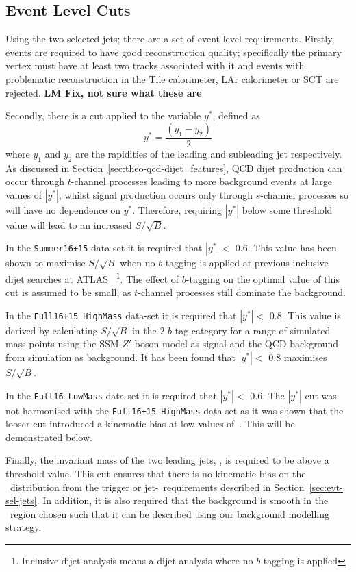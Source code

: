 \subsection{Event Level Cuts}
\label{sec:evt-sel-event}

Using the two selected jets; there are a set of event-level requirements.
Firstly, events are required to have good reconstruction quality;
specifically the primary vertex
must have at least two tracks associated with it
and events with problematic reconstruction in the Tile calorimeter, LAr calorimeter or SCT are rejected.
\textbf{LM Fix, not sure what these are}

\noindent
Secondly, there is a cut applied to the variable $y^*$, defined as
\begin{equation}
  y^* = \frac{(y_1-y_2)}{2}
\end{equation}
where $y_1$ and $y_2$ are the rapidities of the leading and subleading jet respectively.
As discussed in Section~\ref{sec:theo-qcd-dijet_features}, QCD dijet production can occur through $t$-channel processes leading to more background events at large values of $|y^*|$,
whilst signal production occurs only through $s$-channel processes so will have no dependence on $y^*$.
Therefore, requiring $|y^*|$ below some threshold value will lead to an increased $S/\sqrt{B}$.

In the \verb|Summer16+15| data-set it is required that $|y^*| <$ 0.6.
This value has been shown to maximise $S/\sqrt{B}$ when no $b$-tagging is applied
at previous inclusive dijet searches at ATLAS~\cite{dijet-mori16_paper}
\footnote{Inclusive dijet analysis means a dijet analysis where no $b$-tagging is applied}.
The effect of $b$-tagging on the optimal value of this cut is assumed to be small,
as $t$-channel processes still dominate the background.

In the \verb|Full16+15_HighMass| data-set it is required that $|y^*| <$ 0.8.
This value is derived by calculating $S/\sqrt{B}$ in the 2 $b$-tag category for a range of simulated mass points
using the SSM $Z'$-boson model as signal and the QCD background from simulation as background.
It has been found that $|y^*| <$ 0.8 maximises $S/\sqrt{B}$.

In the \verb|Full16_LowMass| data-set it is required that $|y^*| <$ 0.6.
The $|y^*|$ cut was not harmonised with the \verb|Full16+15_HighMass| data-set
as it was shown that the looser cut introduced a kinematic bias at low values of~\mjj.
This will be demonstrated below.

Finally, the invariant mass of the two leading jets, \mjj, is required to be above a threshold value.
This cut ensures that there is no kinematic bias on the \mjj~distribution
from the trigger or jet-\pT~requirements described in Section~\ref{sec:evt-sel-jets}.
In addition, it is also required that the background is smooth in the \mjj~region chosen
such that it can be described using our background modelling strategy.


